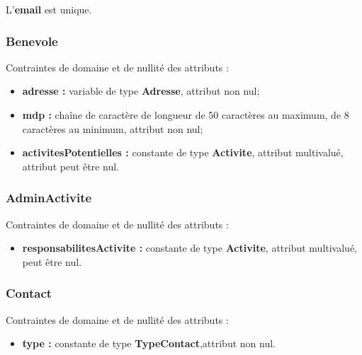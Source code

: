 L'\textbf{email} est unique.\\

\subsubsection*{Benevole}
Contraintes de domaine et de nullité des attributs :
\begin{itemize}
 	\item \textbf{adresse :} variable de type \textbf{Adresse}, attribut non nul;
	\item \textbf{mdp :} chaîne de caractère de longueur de 50 caractères au maximum, de 8 caractères au minimum, attribut non nul;  
	\item \textbf{activitesPotentielles :} constante de type \textbf{Activite}, attribut multivalué, attribut  peut être nul.\\
\end{itemize}  

\subsubsection*{AdminActivite}
Contraintes de domaine et de nullité des attributs :
\begin{itemize}
\item \textbf{responsabilitesActivite :} constante de type \textbf{Activite}, attribut multivalué, peut être nul.\\
\end{itemize}

 
\subsubsection*{Contact}
Contraintes de domaine et de nullité des attributs :
 \begin{itemize}
 \item \textbf{type :} constante de type \textbf{TypeContact},attribut non nul.\\
 \end{itemize}


